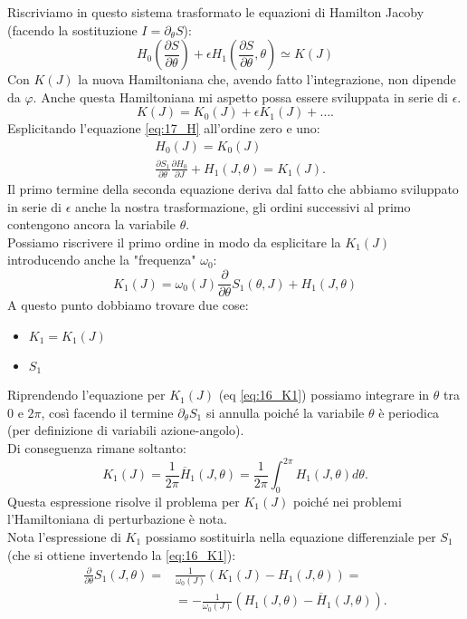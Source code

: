 Riscriviamo in questo sistema trasformato le equazioni di Hamilton Jacoby (facendo la sostituzione $I = \partial_{\theta}S$):
\begin{equation}
    H_0(\frac{\partial S}{\partial \theta} ) + \epsilon H_1(\frac{\partial S}{\partial \theta} , \theta  ) \simeq K(J) 
    \label{eq:17_H}
\end{equation}
Con $K(J)$ la nuova Hamiltoniana che, avendo fatto l'integrazione, non dipende da $\varphi$. Anche questa Hamiltoniana mi aspetto possa essere sviluppata in serie di $\epsilon$.
\[
    K(J) = K_0(J) + \epsilon  K_1(J) + \ldots
.\] 
Esplicitando l'equazione \ref{eq:17_H} all'ordine zero e uno:
\[\begin{aligned}
    & H_0(J) = K_0(J) \\
    & \frac{\partial S_1}{\partial \theta  } \frac{\partial H_0}{\partial J} + H_1(J, \theta) = K_1(J) 
.\end{aligned}\]
Il primo termine della seconda equazione deriva dal fatto che abbiamo sviluppato in serie di $\epsilon$ anche la nostra trasformazione, gli ordini successivi al primo contengono ancora la variabile $\theta$.\\
Possiamo riscrivere il primo ordine in modo da esplicitare la $K_1(J)$ introducendo anche la "frequenza" $\omega_0$:
\begin{equation}
    K_1(J) = \omega_0(J) \frac{\partial }{\partial \theta  } S_1(\theta, J) + H_1(J, \theta) 
    \label{eq:16_K1}
\end{equation}
A questo punto dobbiamo trovare due cose:
\begin{itemize}
    \item $K_1 = K_1(J) $ 
    \item $S_1$ 
\end{itemize}
Riprendendo l'equazione per $K_1(J)$ (eq \ref{eq:16_K1})  possiamo integrare in $\theta$ tra $0$ e $2\pi$, così facendo il termine $\partial_{\theta} S_1$  si annulla poiché la variabile $\theta$ è periodica (per definizione di variabili azione-angolo). \\
Di conseguenza rimane soltanto:
\[
    K_1(J) = \frac{1}{2\pi}\overline{H}_1(J,\theta) =  \frac{1}{2\pi}\int_{0}^{2\pi} H_1(J,\theta  ) d\theta 
.\] 
Questa espressione risolve il problema per $K_1(J)$ poiché nei problemi l'Hamiltoniana di perturbazione è nota. \\
Nota l'espressione di $K_1$ possiamo sostituirla nella equazione differenziale per $S_1$ (che si ottiene invertendo la \ref{eq:16_K1}):
\begin{equation}
\begin{aligned}
    \frac{\partial }{\partial \theta  } S_1(J,\theta) = & \frac{1}{\omega_0(J)}(K_1(J) - H_1(J,\theta)) = \\
							& = -\frac{1}{\omega_0(J) }(H_1(J,\theta  ) - \overline{H}_1(J,\theta) ) 
    \label{eq:17_S_1_diff}
.\end{aligned}
\end{equation}
